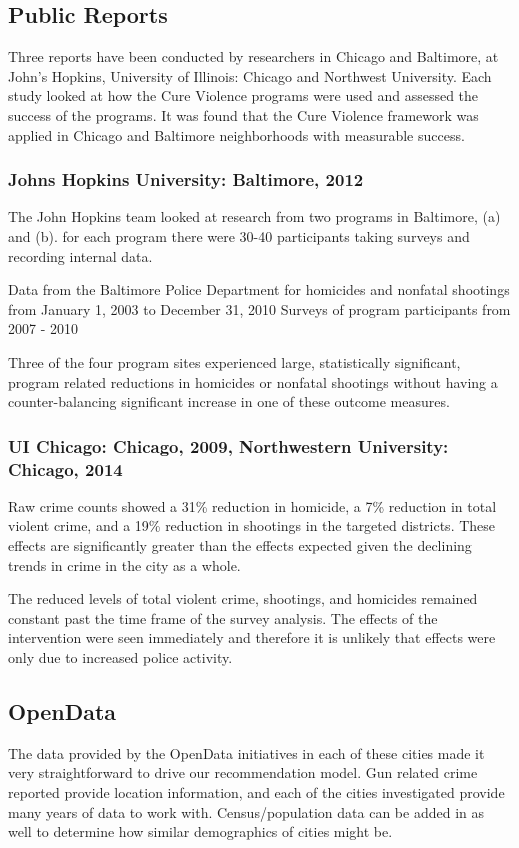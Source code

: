 \documentclass[11pt,preprint]{aastex}
\begin{document}
\subsection*{Public Reports}
Three reports have been conducted by researchers in Chicago and Baltimore, at John's Hopkins,  University of Illinois: Chicago and Northwest University. Each study looked at how the Cure Violence programs were used and assessed the success of the programs. It was found that the Cure Violence framework was applied in Chicago and Baltimore neighborhoods with measurable success.   


\subsubsection*{Johns Hopkins University: Baltimore, 2012}

The John Hopkins team looked at research from two programs in Baltimore, (a) and (b). for each program there were 30-40 participants taking surveys and recording internal data. 

Data from the Baltimore Police Department for homicides and nonfatal shootings from January 1, 2003 to December 31, 2010
Surveys of program participants from 2007 - 2010


Three of the four program sites experienced large, statistically significant, program related reductions in homicides or nonfatal shootings without having a counter-balancing significant increase in one of these outcome measures.


\subsubsection*{UI Chicago: Chicago, 2009, Northwestern University: Chicago, 2014}

Raw crime counts showed a 31\% reduction in homicide, a 7\% reduction in total violent crime, and a 19\% reduction in shootings in the targeted districts. These effects are significantly greater than the effects expected given the declining trends in crime in the city as a whole.

The reduced levels of total violent crime, shootings, and homicides remained constant past the time frame of the survey analysis.  The effects of the intervention were seen immediately and therefore it is unlikely that effects were only due to increased police activity.

\subsection*{OpenData}
The data provided by the OpenData initiatives in each of these cities made it very straightforward to drive our recommendation model.  Gun related crime reported provide location information, and each of the cities investigated provide many years of data to work with. Census/population data can be added in as well to determine how similar demographics of cities might be.
\newpage
\end{document}
